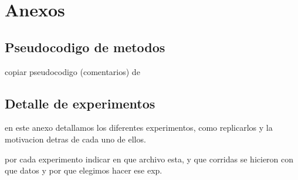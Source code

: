 \section{Anexos}
\subsection{Pseudocodigo de metodos}
copiar pseudocodigo (comentarios) de %

\subsection{Detalle de experimentos}

en este anexo detallamos los diferentes experimentos, como replicarlos y la
motivacion detras de cada uno de ellos.

por cada experimento indicar en que archivo esta, y que corridas se hicieron
con que datos y por que elegimos hacer ese exp.
